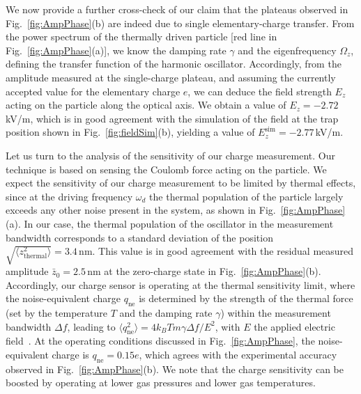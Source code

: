 \documentclass[aps,amssymb,amsmath,pra,reprint,noshowpacs]{revtex4-1}
\begin{document}
We now provide a further cross-check of our claim that the plateaus observed in Fig.~\ref{fig:AmpPhase}(b) are indeed due to single elementary-charge transfer. From the power spectrum of the thermally driven particle [red line in Fig.~\ref{fig:AmpPhase}(a)], we know the damping rate $\gamma$ and the eigenfrequency $\Omega_z$, defining the transfer function of the harmonic oscillator. Accordingly, from the amplitude measured at the single-charge plateau, and assuming the currently accepted value for the elementary charge $e$, we can deduce the field strength $E_z$ acting on the particle along the optical axis. We obtain a value of $E_z=-2.72$\,kV/m, which is in good agreement with the simulation of the field at the trap position shown in Fig.~\ref{fig:fieldSim}(b), yielding a value of $E_z^\mathrm{sim}=-2.77$\,kV/m.

Let us turn to the analysis of the sensitivity of our charge measurement. Our technique is based on sensing the Coulomb force acting on the particle.
We expect the sensitivity of our charge measurement to be limited by thermal effects, since at the driving frequency $\omega_d$ the thermal population of the particle largely exceeds any other noise present in the system, as shown in Fig.~\ref{fig:AmpPhase}(a). In our case, the thermal population of the oscillator in the measurement bandwidth corresponds to a standard deviation of the position $\sqrt{\langle z_\text{thermal}^2\rangle}=3.4\,\text{nm}$. This value is in good agreement with the residual measured amplitude $\bar z_\text{0}=2.5\,\text{nm}$ at the zero-charge state in Fig.~\ref{fig:AmpPhase}(b). {Accordingly, our charge sensor is operating at the thermal sensitivity limit, where the noise-equivalent charge $q_\text{ne}$ is determined by the strength of the thermal force (set by the temperature $T$ and the damping rate $\gamma$) within the measurement bandwidth $\Delta f$, leading to $\langle q_\text{ne}^2\rangle=4k_BTm\gamma\Delta f/E^2$, with $E$ the applied electric field~\cite{Braginsky1985}.} At the operating conditions discussed in Fig.~\ref{fig:AmpPhase}, the noise-equivalent charge is $q_\text{ne} = 0.15e$, which agrees with the experimental accuracy observed in Fig.~\ref{fig:AmpPhase}(b).
We note that the charge sensitivity can be boosted by operating at lower gas pressures and lower gas temperatures.
\end{document}
